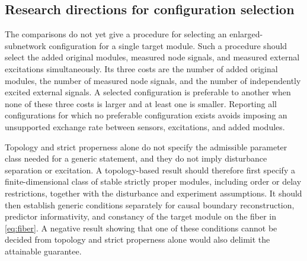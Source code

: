 \documentclass[11pt,a4paper]{article}
\begin{document}
\subsection{Research directions for configuration selection}

The comparisons do not yet give a procedure for selecting an enlarged-subnetwork configuration for a single target module.  Such a procedure should select the added original modules, measured node signals, and measured external excitations simultaneously.  Its three costs are the number of added original modules, the number of measured node signals, and the number of independently excited external signals.  A selected configuration is preferable to another when none of these three costs is larger and at least one is smaller.  Reporting all configurations for which no preferable configuration exists avoids imposing an unsupported exchange rate between sensors, excitations, and added modules.

Topology and strict properness alone do not specify the admissible parameter class needed for a generic statement, and they do not imply disturbance separation or excitation.  A topology-based result should therefore first specify a finite-dimensional class of stable strictly proper modules, including order or delay restrictions, together with the disturbance and experiment assumptions.  It should then establish generic conditions separately for causal boundary reconstruction, predictor informativity, and constancy of the target module on the fiber in \eqref{eq:fiber}.  A negative result showing that one of these conditions cannot be decided from topology and strict properness alone would also delimit the attainable guarantee.
\end{document}
